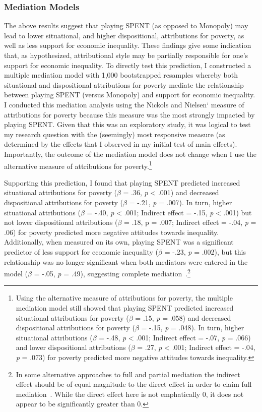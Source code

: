 \documentclass{sfuthesis}
\begin{document}
\subsubsection{Mediation Models}

The above results suggest that playing SPENT (as opposed to Monopoly) may lead to lower situational, and higher dispositional, attributions for poverty, as well as less support for economic inequality. These findings give some indication that, as hypothesized, attributional style may be partially responsible for one’s support for economic inequality. To directly test this prediction, I constructed a multiple mediation model with 1,000 bootstrapped resamples whereby both situational and dispositional attributions for poverty mediate the relationship between playing SPENT (versus Monopoly) and support for economic inequality. I conducted this mediation analysis using the Nickols and Nielsen`\cite{nickols11} measure of attributions for poverty because this measure was the most strongly impacted by playing SPENT. Given that this was an exploratory study, it was logical to test my research question with the (seemingly) most responsive measure (as determined by the effects that I observed in my initial test of main effects). Importantly, the outcome of the mediation model does not change when I use the alternative measure of attributions for poverty.\footnote{Using the alternative measure of attributions for poverty, the multiple mediation model still showed that playing SPENT predicted increased situational attributions for poverty ($\beta$ = .15, \textit{p} = .058) and decreased dispositional attributions for poverty ($\beta$ = -.15, \textit{p} = .048). In turn, higher situational attributions ($\beta$ = -.48, \textit{p} < .001; Indirect effect = -.07, \textit{p} = .066) and lower dispositional attributions ($\beta$ = .27, \textit{p} < .001; Indirect effect = -.04, \textit{p} = .073) for poverty predicted more negative attitudes towards inequality.}

Supporting this prediction, I found that playing SPENT predicted increased situational attributions for poverty ($\beta$ = .36, \textit{p} < .001) and decreased dispositional attributions for poverty ($\beta$ = -.21, \textit{p} = .007). In turn, higher situational attributions ($\beta$ = -.40, \textit{p} < .001; Indirect effect = -.15, \textit{p} < .001) but not lower dispositional attributions ($\beta$ = .18, p = .007; Indirect effect = -.04, \textit{p} = .06) for poverty predicted more negative attitudes towards inequality. Additionally, when measured on its own, playing SPENT was a significant predictor of less support for economic inequality ($\beta$ = -.23, \textit{p} = .002), but this relationship was no longer significant when both mediators were entered in the model ($\beta$ = -.05, \textit{p} = .49), suggesting complete mediation~\cite{baron86, rucker11}.\footnote{In some alternative approaches to full and partial mediation the indirect effect should be of equal magnitude to the direct effect in order to claim full mediation~\cite{shrout02}. While the direct effect here is not emphatically 0, it does not appear to be significantly greater than 0.} 
\end{document}
